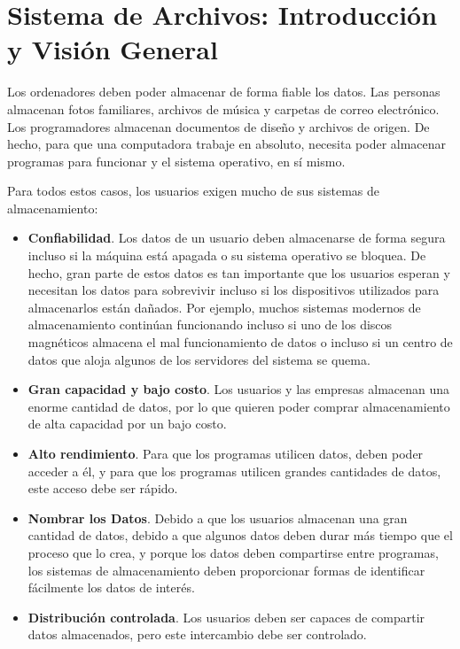 \documentclass[10pt]{book}
\begin{document}
\setcounter{chapter}{10}
\chapter{Sistema de Archivos: Introducción y Visión General}
Los ordenadores deben poder almacenar de forma fiable los datos. Las personas almacenan fotos familiares, archivos de música y carpetas de correo electrónico. Los programadores almacenan documentos de diseño y archivos de origen. De hecho, para que una computadora trabaje en absoluto, necesita poder almacenar programas para funcionar y el sistema operativo, en sí mismo.

Para todos estos casos, los usuarios exigen mucho de sus sistemas de almacenamiento:
\begin{itemize}
\item \textbf{Confiabilidad}. Los datos de un usuario deben almacenarse de forma segura incluso si la máquina está apagada o su sistema operativo se bloquea. De hecho, gran parte de estos datos es tan importante que los usuarios esperan y necesitan los datos para sobrevivir incluso si los dispositivos utilizados para almacenarlos están dañados. Por ejemplo, muchos sistemas modernos de almacenamiento continúan funcionando incluso si uno de los discos magnéticos almacena el mal funcionamiento de datos o incluso si un centro de datos que aloja algunos de los servidores del sistema se quema.

\item \textbf{Gran capacidad y bajo costo}. Los usuarios y las empresas almacenan una enorme cantidad de datos, por lo que quieren poder comprar almacenamiento de alta capacidad por un bajo costo.

\item \textbf{Alto rendimiento}. Para que los programas utilicen datos, deben poder acceder a él, y para que los programas utilicen grandes cantidades de datos, este acceso debe ser rápido.

\item \textbf{Nombrar los Datos}. Debido a que los usuarios almacenan una gran cantidad de datos, debido a que algunos datos deben durar más tiempo que el proceso que lo crea, y porque los datos deben compartirse entre programas, los sistemas de almacenamiento deben proporcionar formas de identificar fácilmente los datos de interés. 

\item \textbf{Distribución controlada}. Los usuarios deben ser capaces de compartir datos almacenados, pero este intercambio debe ser controlado.
\end{itemize}
\end{document}
